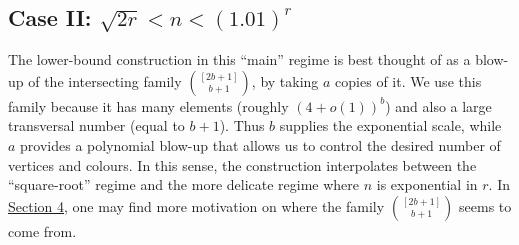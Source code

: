 \documentclass[11pt,a4paper]{article}
\begin{document}
\subsection*{Case II: $\sqrt{2r} < n  < (1.01)^r$}
The lower-bound construction in this ``main'' regime is best thought of as a blow-up of the intersecting family $\binom{[2b+1]}{b+1}$, by taking $a$ copies of it. We use this family because it has many elements (roughly $(4+o(1))^b$) and also a large transversal number (equal to $b+1$). Thus $b$ supplies the exponential scale, while $a$ provides a polynomial blow-up that allows us to control the desired number of vertices and colours. In this sense, the construction interpolates between the ``square-root'' regime and the more delicate regime where $n$ is exponential in $r$. In \hyperref[sec:4]{Section 4}, one may find more motivation on where the family $\binom{[2b+1]}{b+1}$ seems to come from.\\
\end{document}
